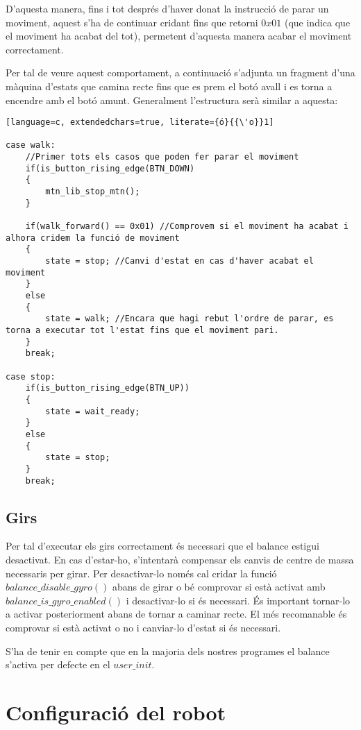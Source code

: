 \documentclass{article}
\begin{document}
D'aquesta manera, fins i tot després d'haver donat la instrucció de parar un moviment, aquest s'ha de continuar cridant fins que retorni $0x01$ (que indica que el moviment ha acabat del tot), permetent d'aquesta manera acabar el moviment correctament. 

Per tal de veure aquest comportament, a continuació s'adjunta un fragment d'una màquina d'estats que camina recte fins que es prem el botó avall i es torna a encendre amb el botó amunt. Generalment l'estructura serà similar a aquesta:

\begin{lstlisting}[language=c, extendedchars=true, literate={ó}{{\'o}}1]

case walk: 	
	//Primer tots els casos que poden fer parar el moviment
	if(is_button_rising_edge(BTN_DOWN)
	{
		mtn_lib_stop_mtn(); 
	}

	if(walk_forward() == 0x01) //Comprovem si el moviment ha acabat i alhora cridem la funció de moviment
	{
		state = stop; //Canvi d'estat en cas d'haver acabat el moviment
	}
	else
	{
		state = walk; //Encara que hagi rebut l'ordre de parar, es torna a executar tot l'estat fins que el moviment pari.
	}
	break;	      
	  
case stop: 
	if(is_button_rising_edge(BTN_UP))
	{
		state = wait_ready;
	}
	else
	{
		state = stop;
	}
	break;
\end{lstlisting}

\subsection{Girs}
Per tal d'executar els girs correctament és necessari que el balance estigui desactivat. En cas d'estar-ho, s'intentarà compensar els canvis de centre de massa necessaris per girar. Per desactivar-lo només cal cridar la funció $balance\_disable\_gyro()$ abans de girar o bé comprovar si està activat amb $balance\_is\_gyro\_enabled()$ i desactivar-lo si és necessari. És important tornar-lo a activar posteriorment abans de tornar a caminar recte. El més recomanable és comprovar si està activat o no i canviar-lo d'estat si és necessari.

S'ha de tenir en compte que en la majoria dels nostres programes el balance s'activa per defecte en el $user\_init$.

\section{Configuració del robot}
\end{document}
